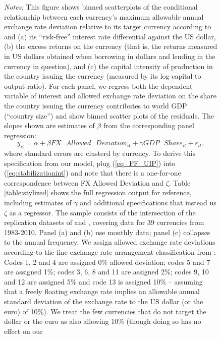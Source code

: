 \documentclass[12pt,letter]{article}
\theoremstyle{break} \theorembodyfont{\normalfont\itshape}
\theoremstyle{break}
\theoremstyle{break} \theorembodyfont{\normalfont\itshape}
\theoremstyle{break} \theorembodyfont{\normalfont\itshape}
\begin{document}
\begin{figure}
\begin{minipage}{\linewidth}
    \bigskip \small \textit{Notes:} This figure shows binned
    scatterplots of the conditional relationship between each
    currency's maximum allowable annual exchange rate deviation relative to
    its target currency according to \cite{ilzetzki2018exchange} and
    (a) its ``risk-free'' interest rate differential against the US
    dollar, (b) the excess returns on the currency (that is, the
    returns measured in US dollars obtained when borrowing in dollars
    and lending in the currency in question), and (c) the capital
    intensity of production in the country issuing the currency (measured by its log
    capital to output ratio). For each panel, we regress both the
    dependent variable of interest and allowed exchange rate deviation
    on the share the country issuing the currency contributes to world
    GDP (``country size'') and show binned scatter plots of the
    residuals. The slopes shown are estimates of \(\beta\) from the
    corresponding panel regression:
    \begin{equation*}
      y_{it}
      = \alpha + \beta FX\text{ }Allowed\text{ }Deviation_{it}
      + \gamma GDP\text{ }Share_{it} + \epsilon_{it},
    \end{equation*}
    where standard errors are clusterd by currency. To derive this
    specification from our model, plug (\ref{eq_FF_UIP}) into
    (\ref{eq:stabilizationint}) and note that there is a one-for-one
    correspondence between FX Allowed Deviation and \(\zeta\). Table
    \ref{table:stylized} shows the full regression output for
    reference, including estimates of \(\gamma\) and additional
    specifications that instead us \(\zeta\) as a regressor. The
    sample consists of the intersection of the replication datasets of
    \cite{HassanMano2015} and \cite{ilzetzki2018exchange}, covering
    data for 39 currencies from 1983-2010. Panel (a) and (b) use
    monthly data; panel (c) collapses to the annual frequency. We
    assign allowed exchange rate deviations according to the fine
    exchange rate arrangement classification from
    \citet{ilzetzki2018exchange}: Codes 1, 2 and 4 are assigned 0\%
    allowed deviation; codes 5 and 7 are assigned 1\%; codes 3, 6, 8
    and 11 are assigned 2\%; codes 9, 10 and 12 are assigned 5\% and
    code 13 is assigned 10\% -- assuming that a freely floating
    exchange rate implies an allowable annual standard deviation of
    the exchange rate to the US dollar (or the euro) of 10\%). We
    treat the few currencies that do not target the dollar or the euro
    as also allowing 10\% (though doing so has no effect on our

\end{minipage}
\end{figure}
\end{document}
